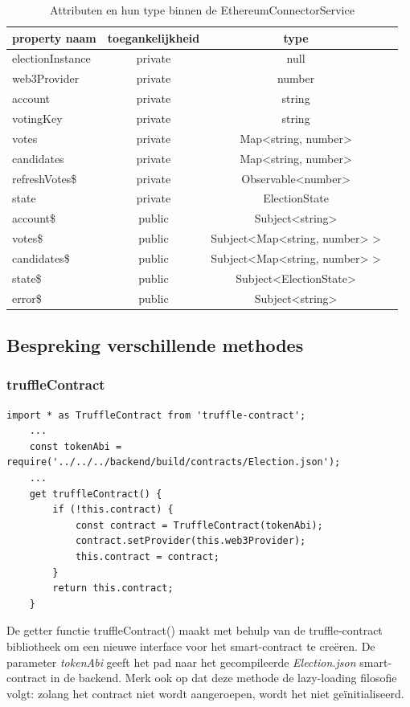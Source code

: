 	\begin{table}
		\centering
		\begin{tabular}{ |l|c|c|c| } 
			\hline
			\textbf{property naam} & \textbf{toegankelijkheid}&  \textbf{type}  \\
			\hline
			electionInstance 		& private & null \\ 
			web3Provider 			& private & number\\ 
			account 					  & private & string \\ 
			votingKey 					& private & string \\ 
			votes 							 & private & Map<string, number> \\ 
			candidates 					& private & Map<string, number>  \\ 
			refreshVotes\$ 			 & private & Observable<number>  \\ 
			state 							  & private & ElectionState  \\ 
			account\$  					& public & Subject<string> \\ 
			votes\$  					   & public & Subject<Map<string, number> > \\ 
			candidates\$ 			 & public & Subject<Map<string, number> > \\ 
			state\$ 						& public & Subject<ElectionState>  \\ 
			error\$ 						& public & Subject<string> \\ 
			\hline
		\end{tabular}
	\caption{Attributen en hun type binnen de EthereumConnectorService}
	\label{tab:ethservice}
\end{table}
\newpage
\subsection{Bespreking verschillende methodes}
	\subsubsection{truffleContract}
	\lstset{language=JavaScriptSolidity} 
	\begin{lstlisting}[numbers=none]
	import * as TruffleContract from 'truffle-contract';
	...
	const tokenAbi = require('../../../backend/build/contracts/Election.json');
	...
	get truffleContract() {
		if (!this.contract) {
			const contract = TruffleContract(tokenAbi);
			contract.setProvider(this.web3Provider);
			this.contract = contract;
		}
		return this.contract;
	}
	\end{lstlisting}
	De getter functie truffleContract() maakt met behulp van de  truffle-contract bibliotheek om een nieuwe interface voor het smart-contract te creëren. De parameter \textit{tokenAbi} geeft het pad naar het gecompileerde \textit{Election.json} smart-contract in de backend. Merk ook op dat deze methode de lazy-loading filosofie volgt: zolang het contract niet wordt aangeroepen, wordt het niet geïnitialiseerd.
